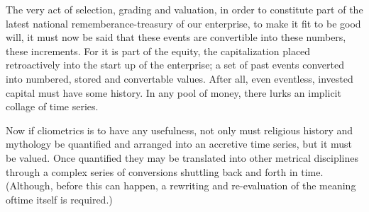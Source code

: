The very act of selection, grading and
valuation, in order to constitute part of the
latest national rememberance-treasury of
our enterprise, to make it fit to be good will,
it must now be said that these events are
convertible into these numbers, these increments. For it is part of the equity, the capitalization placed retroactively into the start
up of the enterprise; a set of past events
converted into numbered, stored and convertable values. After all, even eventless,
invested capital must have some history. In
any pool of money, there lurks an implicit
collage of time series.

Now if cliometrics is to have any usefulness, not only must religious history and
mythology be quantified and arranged into
an accretive time series, but it must be valued. Once quantified they may be translated
into other metrical disciplines through a
complex series of conversions shuttling
back and forth in time. (Although, before
this can happen, a rewriting and re-evaluation of the meaning oftime itself is required.)

